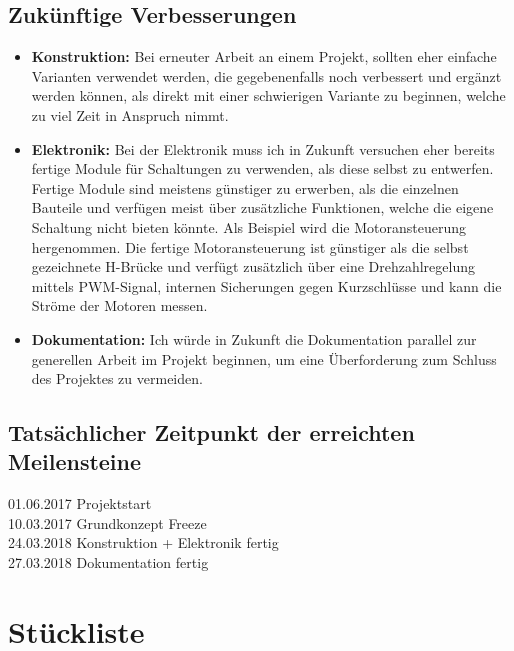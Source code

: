 \subsection{Zukünftige Verbesserungen}
\begin{itemize}
\item \textbf{Konstruktion:} Bei erneuter Arbeit an einem Projekt, sollten eher einfache Varianten verwendet werden, die gegebenenfalls noch verbessert und ergänzt werden können, als direkt mit einer schwierigen Variante zu beginnen, welche zu viel Zeit in Anspruch nimmt.
\item \textbf{Elektronik:} Bei der Elektronik muss ich in Zukunft versuchen eher bereits fertige Module für Schaltungen zu verwenden, als diese selbst zu entwerfen. Fertige Module sind meistens günstiger zu erwerben, als die einzelnen Bauteile und verfügen meist über zusätzliche Funktionen, welche die eigene Schaltung nicht bieten könnte. Als Beispiel wird die Motoransteuerung hergenommen. Die fertige Motoransteuerung ist günstiger als die selbst gezeichnete H-Brücke und verfügt zusätzlich über eine Drehzahlregelung mittels \ac{PWM}-Signal, internen Sicherungen gegen Kurzschlüsse und kann die Ströme der Motoren messen.
\item \textbf{Dokumentation:} Ich würde in Zukunft die Dokumentation parallel zur generellen Arbeit im Projekt beginnen, um eine Überforderung zum Schluss des Projektes zu vermeiden.
\end{itemize}
\subsection{Tatsächlicher Zeitpunkt der erreichten Meilensteine}
01.06.2017 Projektstart\\

10.03.2017 Grundkonzept Freeze\\

24.03.2018 Konstruktion + Elektronik fertig\\

27.03.2018 Dokumentation fertig\\
\section{Stückliste}

